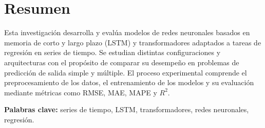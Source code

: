 \chapter*{Resumen}

Esta investigación desarrolla y evalúa modelos de redes neuronales basados en memoria de corto y largo plazo (LSTM) y transformadores adaptados a tareas de regresión en series de tiempo. Se estudian distintas configuraciones y arquitecturas con el propósito de comparar su desempeño en problemas de predicción de salida simple y múltiple. El proceso experimental comprende el preprocesamiento de los datos, el entrenamiento de los modelos y su evaluación mediante métricas como RMSE, MAE, MAPE y $R^2$.

\vspace{0.5cm}
\noindent\textbf{Palabras clave:} series de tiempo, LSTM, transformadores, redes neuronales, regresión.
